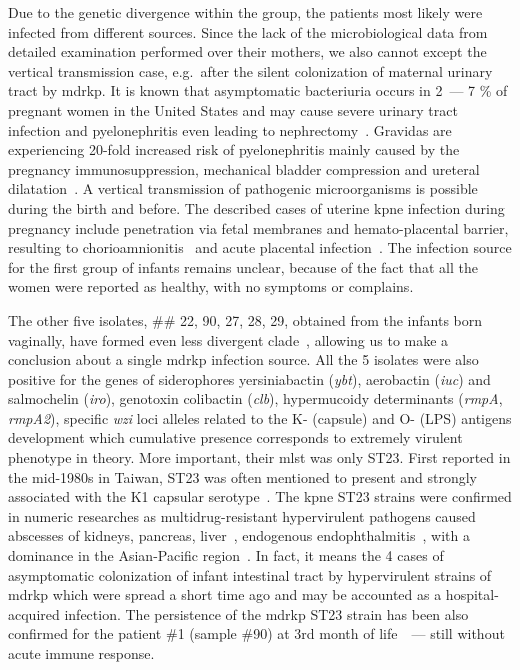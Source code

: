 Due to the genetic divergence within the group, the patients most likely were infected from different sources.
Since the lack of the microbiological data from detailed examination performed over their mothers, we also cannot except
the vertical transmission case, e.g.\ after the silent colonization of maternal urinary tract by \gls{mdrkp}.
It is known that asymptomatic bacteriuria occurs in 2~--- 7 \% of pregnant women in the United States
and may cause severe urinary tract infection and pyelonephritis even leading to nephrectomy~\cite{Kim2018}.
Gravidas are experiencing 20-fold increased risk of pyelonephritis mainly caused by the pregnancy immunosuppression,
mechanical bladder compression and ureteral dilatation~\cite{Farkash2012}.
A vertical transmission of pathogenic microorganisms is possible during the birth and before.
The described cases of uterine \gls{kpne} infection during pregnancy include penetration via fetal membranes and
hemato-placental barrier, resulting to chorioamnionitis~\cite{Oh2017} and acute placental infection~\cite{Sheikh2005}.
The infection source for the first group of infants remains unclear, because of the fact that all the women
were reported as healthy, with no symptoms or complains.

The other five isolates, \#\# 22, 90, 27, 28, 29, obtained from the infants born vaginally, have formed even less
divergent clade~, allowing us to make a conclusion about a single \gls{mdrkp} infection source.
All the 5 isolates were also positive for the genes of siderophores yersiniabactin (\textit{ybt}),
aerobactin (\textit{iuc}) and salmochelin (\textit{iro}), genotoxin colibactin (\textit{clb}),
hypermucoidy determinants (\textit{rmpA}, \textit{rmpA2}), specific \textit{wzi} loci alleles related to the
K- (capsule) and O- (LPS) antigens development which cumulative presence corresponds to extremely virulent phenotype
in theory.
More important, their \gls{mlst} was only ST23.
First reported in the mid-1980s in Taiwan, ST23 was often mentioned to present and strongly associated with the
K1 capsular serotype~\cite{Shon2013}.
The \gls{kpne} ST23 strains were confirmed in numeric researches as multidrug-resistant hypervirulent pathogens
caused abscesses of kidneys, pancreas, liver~\cite{Shen2019}, endogenous endophthalmitis~\cite{Xu2018},
with a dominance in the Asian-Pacific region~\cite{Thiry2019}.
In fact, it means the 4 cases of asymptomatic colonization of infant intestinal tract by hypervirulent strains of
\gls{mdrkp} which were spread a short time ago and may be accounted as a hospital-acquired infection.
The persistence of the \gls{mdrkp} ST23 strain has been also confirmed for the patient \#1 (sample \#90)
at 3rd month of life~~--- still without acute immune response.

